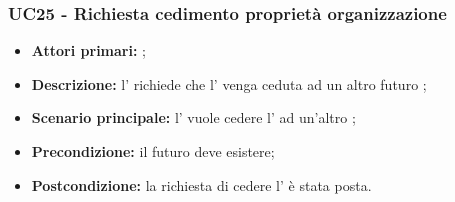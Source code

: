 \documentclass[casi-duso]{subfiles}
\begin{document}
\subsubsection{UC25 - Richiesta cedimento proprietà organizzazione}
\label{subsub:UC25}

\begin{itemize}
  \item \textbf{Attori primari:} ;
  \item \textbf{\textbf{Descrizione:}} l'  richiede che l' venga ceduta ad un altro futuro ;
  \item \textbf{\textbf{Scenario principale:}} l'  vuole cedere l' ad un'altro ;
  \item \textbf{Precondizione:} il futuro  deve esistere;
  \item \textbf{Postcondizione:} la richiesta di cedere l' è stata posta.

\end{itemize}

\end{document}
